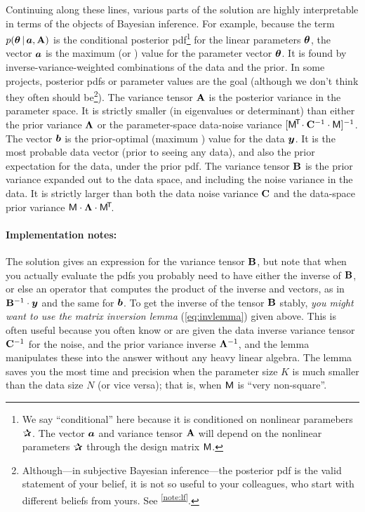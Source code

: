 Continuing along these lines,
various parts of the solution are highly interpretable in terms of the
objects of Bayesian inference. For example, because the term $p(\boldsymbol{\theta}\,|\,
\boldsymbol{a},\mathbf{A})$ is the conditional posterior pdf\footnote{We say ``conditional'' here
  because it is conditioned on nonlinear paramebers $\bP$.
  The vector $\boldsymbol{a}$ and variance tensor
  $\mathbf{A}$ will depend on the nonlinear parameters $\bP$ through the design matrix
  $\mathsf{M}$.} for the linear parameters $\boldsymbol{\theta}$, the vector $\boldsymbol{a}$ is the maximum
 (or ) value for the parameter vector
$\boldsymbol{\theta}$.
It is found by inverse-variance-weighted combinations of the data and the prior.
In some projects, posterior pdfs or  parameter values are the goal
(although we don't think they often should be\footnote{Although---in subjective
  Bayesian inference---the posterior pdf
  is the valid statement of your belief, it is not so useful to your colleagues,
  who start with different beliefs from yours. See \notename\textsuperscript{\ref{note:lf}}.}).
The variance tensor $\mathbf{A}$ is the posterior variance in the parameter space.
It is strictly smaller (in eigenvalues or determinant) than either
the prior variance $\mathbf{\Lambda}$ or the parameter-space data-noise
variance $[\mathsf{M}^{\!\mathsf{T}\!}\cdot\mathbf{C}^{-1}\cdot\mathsf{M}]^{-1}$.
The vector $\boldsymbol{b}$ is the prior-optimal (maximum )
value for the data $\boldsymbol{y}$.
It is the most probable data vector (prior to seeing any data),
and also the prior expectation for the data,
under the prior pdf.
The variance tensor $\mathbf{B}$ is the prior variance expanded out to the
data space, and including the noise variance in the data.
It is strictly larger than both the data noise variance $\mathbf{C}$ and the
data-space prior variance $\mathsf{M}\cdot\mathbf{\Lambda}\cdot\mathsf{M}^{\!\mathsf{T}\!}$.


\paragraph{Implementation notes:}
The solution gives an expression for the variance tensor $\mathbf{B}$, but
note that when you actually evaluate the pdfs you probably need to
have either the inverse of $\mathbf{B}$, or else an operator that computes
the product of the inverse and vectors, as in $\mathbf{B}^{-1}\cdot\boldsymbol{y}$ and
the same for $\boldsymbol{b}$.
To get the inverse of the tensor $\mathbf{B}$ stably, \emph{you might want to use
the matrix inversion lemma} (\ref{eq:invlemma}) given above.
This is often useful because you often know or are given the data inverse variance
tensor $\mathbf{C}^{-1}$ for the noise, and the prior variance inverse
$\mathbf{\Lambda}^{-1}$, and the lemma manipulates these into the answer without
any heavy linear algebra.
The lemma saves you the most time and precision when the parameter size $K$
is much smaller than the data size $N$ (or vice versa); that is, when $\mathsf{M}$
is ``very non-square''.

